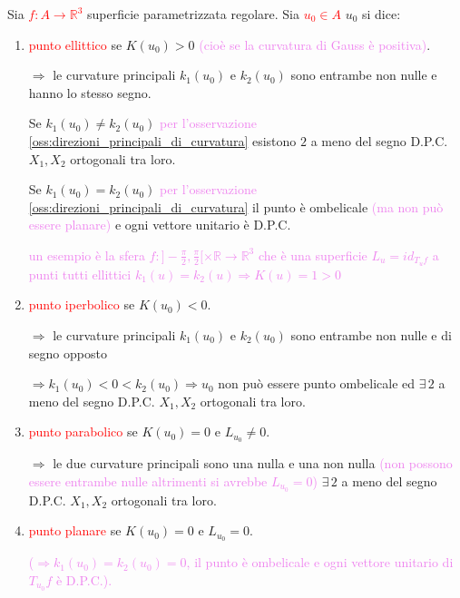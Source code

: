         \begin{definizione}
        Sia \textcolor{red}{$f : A \to \mathbb{R}^3$} superficie parametrizzata regolare. Sia \textcolor{red}{$u_0 \in A$} $u_0$ si dice:
        \begin{enumerate}[label=\arabic*)]
            \item \textcolor{red}{punto ellittico} se $K(u_0) > 0$ \textcolor{violet}{(cioè se la curvatura di Gauss è positiva)}.
            
            \textcolor{blu}{$\Rightarrow$ le curvature principali $k_1(u_0)$ e $k_2(u_0)$ sono entrambe non nulle e hanno lo stesso segno.}
            
            \textcolor{blu}{Se $k_1(u_0) \neq k_2(u_0)$ \textcolor{violet}{per l'osservazione \ref{oss:direzioni_principali_di_curvatura}} esistono $2$ a meno del segno D.P.C. $X_1, X_2$ ortogonali tra loro.}
            
            \textcolor{blu}{Se $k_1(u_0) = k_2(u_0)$ \textcolor{violet}{per l'osservazione \ref{oss:direzioni_principali_di_curvatura}} il punto è ombelicale \textcolor{violet}{(ma non 
            può essere planare)} e ogni vettore unitario è D.P.C.}

            \textcolor{violet}{un esempio è la sfera $f \colon ] - \frac{\pi}{2}, \frac{\pi}{2} [ \times \mathbb{R} \to \mathbb{R}^3$ che è una superficie $L_u = id_{T_u f}$ a punti tutti ellittici $k_1(u)=k_2(u) \Rightarrow K(u)=1>0$}
            
            \item \textcolor{red}{punto iperbolico} se $K(u_0) < 0$.
            
            \textcolor{blu}{$\Rightarrow$ le curvature principali $k_1(u_0)$ e $k_2(u_0)$ sono entrambe non nulle e di segno opposto} 
            
            \textcolor{blu}{$\Rightarrow k_1(u_0) < 0 < k_2(u_0) \Rightarrow u_0$ non può essere punto ombelicale ed $\exists \, 2$ a meno del segno D.P.C. $X_1, X_2$ ortogonali tra loro.}
            
            \item \textcolor{red}{punto parabolico} se $K(u_0) = 0$ e $L_{u_0} \neq 0$.
            
            \textcolor{blu}{$\Rightarrow$ le due curvature principali sono una nulla e una non nulla \textcolor{violet}{(non possono essere entrambe nulle altrimenti si avrebbe $L_{u_0} = 0$)}}
            \textcolor{blu}{$\exists \, 2$ a meno del segno D.P.C. $X_1, X_2$ ortogonali tra loro.}
            
            \item \textcolor{red}{punto planare} se $K(u_0) = 0$ e $L_{u_0} = 0$.
            
            \textcolor{violet}{($\Rightarrow k_1(u_0) = k_2(u_0) = 0$, il punto è ombelicale e ogni vettore unitario di $T_{u_0}f$ è D.P.C.).}
        \end{enumerate}
        \end{definizione}
